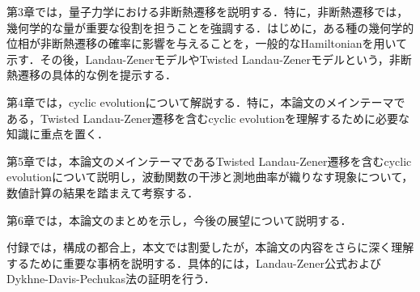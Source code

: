 \documentclass[a4paper, titlepage]{jsreport}
\begin{document}
第3章では，量子力学における非断熱遷移を説明する．特に，非断熱遷移では，幾何学的な量が重要な役割を担うことを強調する．はじめに，ある種の幾何学的位相が非断熱遷移の確率に影響を与えることを，一般的なHamiltonianを用いて示す．その後，Landau-ZenerモデルやTwisted Landau-Zenerモデルという，非断熱遷移の具体的な例を提示する．


第4章では，cyclic evolutionについて解説する．特に，本論文のメインテーマである，Twisted Landau-Zener遷移を含むcyclic evolutionを理解するために必要な知識に重点を置く．


第5章では，本論文のメインテーマであるTwisted Landau-Zener遷移を含むcyclic evolutionについて説明し，波動関数の干渉と測地曲率が織りなす現象について，数値計算の結果を踏まえて考察する．


第6章では，本論文のまとめを示し，今後の展望について説明する．


付録では，構成の都合上，本文では割愛したが，本論文の内容をさらに深く理解するために重要な事柄を説明する．具体的には，Landau-Zener公式\cite{Zener}およびDykhne-Davis-Pechukas法\cite{Dykhne}\cite{DavisPechukas1976}\cite{Hwang}の証明を行う．
\end{document}
